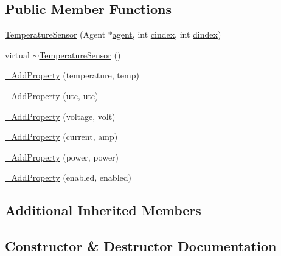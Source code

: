 \subsection*{Public Member Functions}
\begin{DoxyCompactItemize}
\item 
\hyperlink{classcubesat_1_1TemperatureSensor_aa7ca81e3bdb2db2dd3ddc44a7365ee4a}{Temperature\+Sensor} (Agent $\ast$\hyperlink{classcubesat_1_1Device_a8499108eccaf7375bea8ead0182391a6}{agent}, int \hyperlink{classcubesat_1_1Device_a1deca725b01f8ef37e49662da6db4e53}{cindex}, int \hyperlink{classcubesat_1_1Device_a8a2b3d6d7400e6796c31705058172982}{dindex})
\item 
virtual \hyperlink{classcubesat_1_1TemperatureSensor_a523bf4ffa785dd6bc7bcecbca8a1b4ad}{$\sim$\+Temperature\+Sensor} ()
\item 
\hyperlink{classcubesat_1_1TemperatureSensor_a7a191dc0c0869faa901dee9fdbbafa89}{\+\_\+\+Add\+Property} (temperature, temp)
\item 
\hyperlink{classcubesat_1_1TemperatureSensor_a909aded0971edb466e23c1caee1c50dc}{\+\_\+\+Add\+Property} (utc, utc)
\item 
\hyperlink{classcubesat_1_1TemperatureSensor_aa75b140a9c33cc64cb385905d870aa29}{\+\_\+\+Add\+Property} (voltage, volt)
\item 
\hyperlink{classcubesat_1_1TemperatureSensor_a9d85987206dd629c2edf00e400f826bf}{\+\_\+\+Add\+Property} (current, amp)
\item 
\hyperlink{classcubesat_1_1TemperatureSensor_ab8263308c1d38e54f866e35532e22122}{\+\_\+\+Add\+Property} (power, power)
\item 
\hyperlink{classcubesat_1_1TemperatureSensor_a38ae449b0d314d5ee899e7efc7744b79}{\+\_\+\+Add\+Property} (enabled, enabled)
\end{DoxyCompactItemize}
\subsection*{Additional Inherited Members}


\subsection{Constructor \& Destructor Documentation}
\mbox{\label{classcubesat_1_1TemperatureSensor_aa7ca81e3bdb2db2dd3ddc44a7365ee4a}} 
